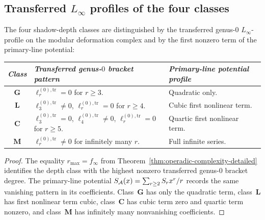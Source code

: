 \subsection{Transferred \texorpdfstring{$L_\infty$}{L-infty} profiles of the four classes}
\label{subsec:thqg-grav-interpretation}

\begin{theorem}
\label{thm:thqg-grav-content}
\ClaimStatusProvedHere
{}
The four shadow-depth classes are distinguished by the transferred
genus-$0$ $L_\infty$-profile on the modular deformation complex
and by the first nonzero term of the primary-line potential:
\begin{center}
\small
\renewcommand{\arraystretch}{1.25}
\begin{tabular}{c@{\quad}l@{\quad}l}
\toprule
\emph{Class} & \emph{Transferred genus-$0$ bracket pattern} &
\emph{Primary-line potential profile} \\
\midrule
$\mathbf{G}$ &
 $\ell_r^{(0),\mathrm{tr}} = 0$ for $r \geq 3$. &
 Quadratic only. \\
$\mathbf{L}$ &
 $\ell_3^{(0),\mathrm{tr}} \neq 0$,
 $\ell_r^{(0),\mathrm{tr}} = 0$ for $r \geq 4$. &
 Cubic first nonlinear term. \\
$\mathbf{C}$ &
 $\ell_3^{(0),\mathrm{tr}} = 0$,
 $\ell_4^{(0),\mathrm{tr}} \neq 0$,
 $\ell_r^{(0),\mathrm{tr}} = 0$ for $r \geq 5$. &
 Quartic first nonlinear term. \\
$\mathbf{M}$ &
 $\ell_r^{(0),\mathrm{tr}} \neq 0$ for infinitely many $r$. &
 Full infinite series. \\
\bottomrule
\end{tabular}
\end{center}
\end{theorem}

\begin{proof}
The equality $r_{\max} = f_\infty$ from
Theorem~\ref{thm:operadic-complexity-detailed} identifies the
depth class with the highest nonzero transferred genus-$0$
bracket degree. The primary-line potential
$S_{\mathcal{A}}(x) = \sum_{r \geq 2} S_r x^r/r$ records the same
vanishing pattern in its coefficients. Class~$\mathbf{G}$ has
only the quadratic term, class~$\mathbf{L}$ has first nonlinear
term cubic, class~$\mathbf{C}$ has cubic term zero and quartic
term nonzero, and class~$\mathbf{M}$ has infinitely many
nonvanishing coefficients.
\end{proof}


